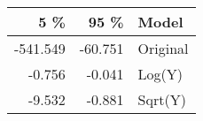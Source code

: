 \begin{table}[ht]
\centering
\begin{tabular}{rrl}
  \hline
5 \% & 95 \% & Model \\ 
  \hline
-541.549 & -60.751 & Original \\ 
  -0.756 & -0.041 & Log(Y) \\ 
  -9.532 & -0.881 & Sqrt(Y) \\ 
   \hline
\end{tabular}
\end{table}
